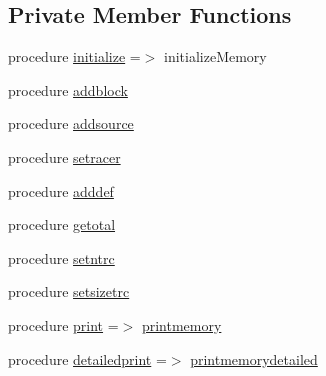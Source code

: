 \subsection*{Private Member Functions}
\begin{DoxyCompactItemize}
\item 
procedure \mbox{\hyperlink{structsimulation__memory__mod_1_1memory__t_aba98543cee9846320a3cb7b522d32525}{initialize}} =$>$ initialize\+Memory
\item 
procedure \mbox{\hyperlink{structsimulation__memory__mod_1_1memory__t_a374c166c7b2412805d1c4e513bdba93b}{addblock}}
\item 
procedure \mbox{\hyperlink{structsimulation__memory__mod_1_1memory__t_a29800fdc8fd46bbe3d3217b2a3fb3da9}{addsource}}
\item 
procedure \mbox{\hyperlink{structsimulation__memory__mod_1_1memory__t_a717a79f556e75ab01e14fe8bc2526908}{setracer}}
\item 
procedure \mbox{\hyperlink{structsimulation__memory__mod_1_1memory__t_a911dd049cf53d2ed80069303ddb3ed9e}{adddef}}
\item 
procedure \mbox{\hyperlink{structsimulation__memory__mod_1_1memory__t_a0f8e7d20bb189b7d28b28e45798bb687}{getotal}}
\item 
procedure \mbox{\hyperlink{structsimulation__memory__mod_1_1memory__t_a4d3ff2586baec966042066cd79f7277c}{setntrc}}
\item 
procedure \mbox{\hyperlink{structsimulation__memory__mod_1_1memory__t_a58a51f6d4273639c2480a549579babf7}{setsizetrc}}
\item 
procedure \mbox{\hyperlink{structsimulation__memory__mod_1_1memory__t_a12a39d94e7e4e9b857d0a5613dd01996}{print}} =$>$ \mbox{\hyperlink{namespacesimulation__memory__mod_a16a7a1c7e88fe5a5523d23f83f0e04a0}{printmemory}}
\item 
procedure \mbox{\hyperlink{structsimulation__memory__mod_1_1memory__t_ac6105b92726abbb5ff671509c7eeea57}{detailedprint}} =$>$ \mbox{\hyperlink{namespacesimulation__memory__mod_a894bd4ec7462fd634d328ee5be4c6483}{printmemorydetailed}}
\end{DoxyCompactItemize}
